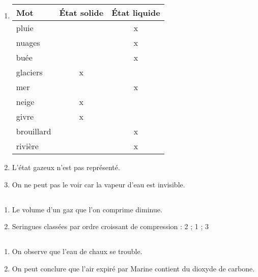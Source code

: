 \begin{enumerate}[label=\alph*)]
	\item 

\begin{tabular}{|l|c|c|}
	\hline
	\textbf{Mot}        & \textbf{\'Etat solide} & \textbf{\'Etat liquide} \\ \hline
	pluie      &               & x              \\ \hline
	nuages     &               & x              \\ \hline
	buée       &               & x              \\ \hline
	glaciers   & x             &                \\ \hline
	mer        &               & x              \\ \hline
	neige      & x             &                \\ \hline
	givre      & x             &                \\ \hline
	brouillard &               & x              \\ \hline
	rivière    &               & x             \\ \hline
\end{tabular}

\item L'état gazeux n'est pas représenté.
\item On ne peut pas le voir car la vapeur d'eau est invisible.

\end{enumerate}

\subsection*{}

\begin{enumerate}[label=\alph*)]
	\item Le volume d'un gaz que l'on comprime diminue.
	\item Seringues classées par ordre croissant de compression : 2 ; 1 ; 3
\end{enumerate}

\subsection*{}

\begin{enumerate}[label=\alph*)]
	\item On observe que l'eau de chaux se trouble.
	\item On peut conclure que l'air expiré par Marine contient du dioxyde de carbone.
\end{enumerate}

